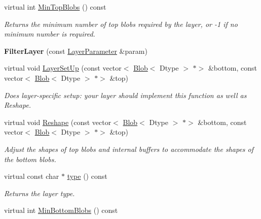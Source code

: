 \begin{DoxyCompactItemize}
virtual int \mbox{\hyperlink{classcaffe_1_1_filter_layer_af8c6eb9b1986e03dd14a907b5caa1324}{Min\+Top\+Blobs}} () const
\begin{DoxyCompactList}\small\item\em Returns the minimum number of top blobs required by the layer, or -\/1 if no minimum number is required. \end{DoxyCompactList}\item 
\mbox{\label{classcaffe_1_1_filter_layer_a7384a8e15c84b16b46b775a11b95cc4f}} 
{\bfseries Filter\+Layer} (const \mbox{\hyperlink{classcaffe_1_1_layer_parameter}{Layer\+Parameter}} \&param)
\item 
virtual void \mbox{\hyperlink{classcaffe_1_1_filter_layer_a59443022ba473d248c63b5ab7a182826}{Layer\+Set\+Up}} (const vector$<$ \mbox{\hyperlink{classcaffe_1_1_blob}{Blob}}$<$ Dtype $>$ $\ast$$>$ \&bottom, const vector$<$ \mbox{\hyperlink{classcaffe_1_1_blob}{Blob}}$<$ Dtype $>$ $\ast$$>$ \&top)
\begin{DoxyCompactList}\small\item\em Does layer-\/specific setup\+: your layer should implement this function as well as Reshape. \end{DoxyCompactList}\item 
virtual void \mbox{\hyperlink{classcaffe_1_1_filter_layer_aea626ef6cdd51ca2ede31319daab2d1b}{Reshape}} (const vector$<$ \mbox{\hyperlink{classcaffe_1_1_blob}{Blob}}$<$ Dtype $>$ $\ast$$>$ \&bottom, const vector$<$ \mbox{\hyperlink{classcaffe_1_1_blob}{Blob}}$<$ Dtype $>$ $\ast$$>$ \&top)
\begin{DoxyCompactList}\small\item\em Adjust the shapes of top blobs and internal buffers to accommodate the shapes of the bottom blobs. \end{DoxyCompactList}\item 
\mbox{\label{classcaffe_1_1_filter_layer_ade903bde57d67d6980b1608bf146fd30}} 
virtual const char $\ast$ \mbox{\hyperlink{classcaffe_1_1_filter_layer_ade903bde57d67d6980b1608bf146fd30}{type}} () const
\begin{DoxyCompactList}\small\item\em Returns the layer type. \end{DoxyCompactList}\item 
virtual int \mbox{\hyperlink{classcaffe_1_1_filter_layer_af4c97961e859653ef0fa21d796af0259}{Min\+Bottom\+Blobs}} () const

\end{DoxyCompactItemize}
